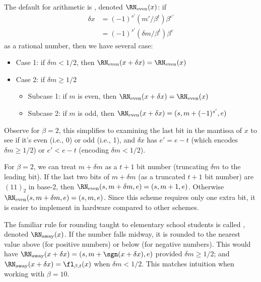 \begin{defn}
  The default for  arithmetic is
  ,
  denoted $\RN_{\text{even}}(x)$:
  if
  \begin{equation}
    \begin{split}
      \delta x &= (-1)^{s'}(m'/\beta^{t})\beta^{e'}\\
      &= (-1)^{s'}(\delta m/\beta^{t})\beta^{e}
    \end{split}
  \end{equation}
  as a rational number, then we have several case:
  \begin{itemize}
    \item Case 1: if $\delta m<1/2$, then $\RN_{\text{even}}(x+\delta x)=\RN_{\text{even}}(x)$
    \item Case 2: if $\delta m\geq1/2$
      \begin{itemize}
        \item Subcase 1: if $m$ is even, then $\RN_{\text{even}}(x+\delta x)=\RN_{\text{even}}(x)$
        \item Subcase 2: if $m$ is odd, then $\RN_{\text{even}}(x+\delta x)=(s,m+(-1)^{s'},e)$
      \end{itemize}
  \end{itemize}
  Observe for $\beta=2$, this simplifies to examining the last bit in
  the mantissa of $x$ to see if it's even (i.e., 0) or odd (i.e., 1),
  and $\delta x$ has $e'=e-t$ (which encodes $\delta m\geq1/2$) or
  $e'<e-t$ (encoding $\delta m<1/2$).
\end{defn}
\begin{rmk}
  For $\beta=2$, we can treat $m+\delta m$ as a $t+1$ bit number
  (truncating $\delta m$ to the leading bit). If the last two bits of
  $m+\delta m$ (as a truncated $t+1$ bit number) are
  $(11)_{2}$ in base-2, then $\RN_{\text{even}}(s,m+\delta m,e)=(s,m+1,e)$.
  Otherwise $\RN_{\text{even}}(s,m+\delta m,e)=(s,m,e)$. Since this
  scheme requires only one extra bit, it is easier to implement in
  hardware compared to other schemes.
\end{rmk}
\begin{defn}
  The familiar rule for rounding taught to elementary school students is
  called , denoted $\RN_{\text{away}}(x)$. If the number falls
  midway, it is rounded to the nearest value above (for positive
  numbers) or below (for negative numbers). This would have
  $\RN_{\text{away}}(x+\delta x)=(s,m+\sgn(x+\delta x), e)$ provided $\delta m\geq1/2$;
  and $\RN_{\text{away}}(x+\delta x)=\fl_{\beta,t}(x)$ when $\delta m<1/2$.
  This matches intuition when working with $\beta=10$.
\end{defn}


